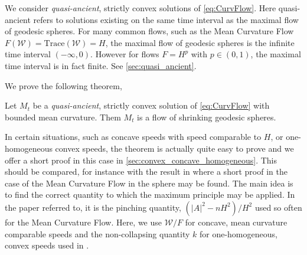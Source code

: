 \documentclass{amsart}
\begin{document}
We consider \emph{quasi-ancient}, strictly convex solutions of \eqref{eq:CurvFlow}. Here quasi-ancient refers to solutions existing on the same time interval as the maximal flow of geodesic spheres. For many common flows, such as the Mean Curvature Flow \(F(\mathcal{W}) = \text{Trace}(\mathcal{W}) = H\), the maximal flow of geodesic spheres is the infinite time interval \((-\infty, 0)\). However for flows \(F = H^p\) with \(p \in (0,1)\), the maximal time interval is in fact finite. See \cref{sec:quasi_ancient}.

We prove the following theorem,
\begin{thm}
Let \(M_t\) be a \emph{quasi-ancient}, strictly convex solution of \eqref{eq:CurvFlow} with bounded mean curvature. Them \(M_t\) is a flow of shrinking geodesic spheres.
\end{thm}

In certain situations, such as concave speeds with speed comparable to \(H\), or one-homogeneous convex speeds, the theorem is actually quite easy to prove and we offer a short proof in this case in \cref{sec:convex_concave_homogeneous}. This should be compared, for instance with the result in \cite[Theorem]{HuiskenSinestrari:05/2014} where a short proof in the case of the Mean Curvature Flow in the sphere may be found. The main idea is to find the correct quantity to which the maximum principle may be applied. In the paper referred to, it is the pinching quantity, \((|A|^2 - n H^2)/H^2\) used so often for the Mean Curvature Flow. Here, we use \(\mathcal{W}/F\) for concave, mean curvature comparable speeds and the non-collapsing quantity \(k\) for one-homogeneous, convex speeds used in \cite{andrews2015Non-collapsing}.
\end{document}
